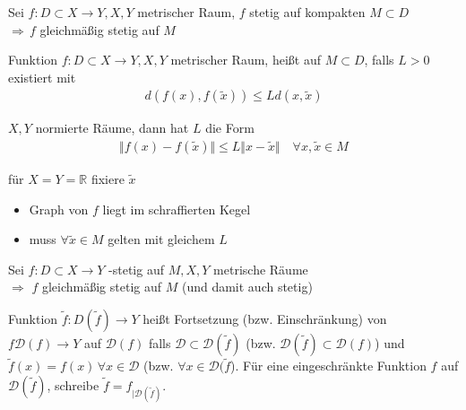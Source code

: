 \begin{proposition}
	Sei $f:D\subset X\to Y, X,Y$ metrischer Raum, $f$ stetig auf kompakten $M\subset D$ \\
	$\Rightarrow \,f$ gleichmäßig stetig auf $M$
\end{proposition}

\begin{definition}
	Funktion $f:D\subset X\to Y, X,Y$ metrischer Raum, heißt  auf $M\subset D$, falls  $L>0$ existiert mit \begin{align}
		\tag{L} d(f(x), f(\tilde{x})) \le Ld(x,\tilde{x})
	\end{align}
	
	 $X,Y$ normierte Räume, dann hat $L$ die Form \begin{align}
		\tag{L'} \Vert f(x) - f(\tilde{x})\Vert \le L\Vert x - \tilde{x}\Vert \quad\forall x,\tilde{x}\in M
	\end{align}
	
	 für $X=Y=\mathbb{R}$ fixiere $\tilde{x}$
	\begin{itemize}
		\item Graph von $f$ liegt im schraffierten Kegel
		\item muss $\forall \tilde{x}\in M$ gelten mit gleichem $L$
	\end{itemize}
\end{definition}

\begin{proposition}
	Sei $f:D\subset X\to Y$ -stetig auf $M,X,Y$ metrische Räume\\
	$\Rightarrow$ $f$ gleichmäßig stetig auf $M$ (und damit auch stetig)
\end{proposition}

\addtocounter{theorem}{2}

\begin{definition}
    Funktion $\tilde{f}: D(\tilde{f}) \to Y$ heißt Fortsetzung (bzw. Einschränkung) von $f \mathcal{D}(f) \to Y$ auf $\mathcal{D}(f)$ falls $\mathcal{D} \subset \mathcal{D}(\tilde{f})$ (bzw. $\mathcal{D}(\tilde{f}) \subset \mathcal{D}(f)$) und $\tilde{f}(x) = f(x) \,\forall x \in \mathcal{D}$ (bzw. $\forall x \in \mathcal{D}(\tilde{f}$). Für eine eingeschränkte Funktion $f$ auf $\mathcal{D}(\tilde{f})$, schreibe $\tilde{f} = f_{\vert \mathcal{D}(\tilde{f})}$.
\end{definition}

